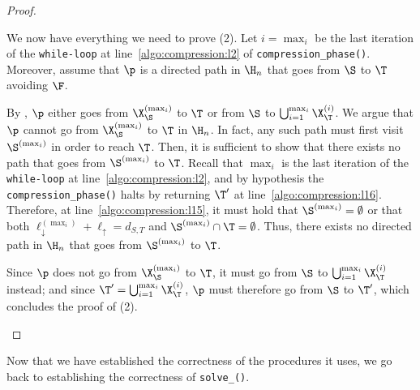 \begin{proof}
\begin{enumerate}
We now have everything we need to prove (2).
Let $i=\max_i$ be the last iteration of the \texttt{while-loop} at line~\ref{algo:compression:l2} of \texttt{compression\_phase()}.
Moreover, assume that $\p$ is a directed path in $\H_n$ that goes from $\S$ to $\T$ avoiding $\F$.

By , $\p$ either goes from
$\X^{(\max_i)}_\S$ to $\T$ or from $\S$ to $\bigcup_{i=1}^{\max_i} \X^{(i)}_\T$.
We argue that $\p$ cannot go from $\X^{(\max_i)}_\S$ to $\T$ in $\H_n$.
In fact, any such path must first visit $\S^{(\max_i)}$ in order to reach $\T$.
Then, it is sufficient to show that there exists no path that goes from $\S^{(\max_i)}$ to $\T$.
Recall that $\max_i$ is the last iteration of the \texttt{while-loop} at line~\ref{algo:compression:l2},
and by hypothesis the \texttt{compression\_phase()} halts by returning $\T'$ at line~\ref{algo:compression:l16}.
Therefore, at line~\ref{algo:compression:l15}, it must hold that $\S^{(\max_i)}=\emptyset$ or that both
$\ell_\downarrow^{(\max_i)}+\ell_\uparrow=d_{S,T}$ and $\S^{(\max_i)}\cap\T=\emptyset$.
Thus, there exists no directed path in $\H_n$ that goes from $\S^{(\max_i)}$ to $\T$.

Since $\p$ does not go from $\X^{(\max_i)}_\S$ to $\T$,
it must go from $\S$ to $\bigcup_{i=1}^{\max_i} \X^{(i)}_\T$ instead; and since
$\T'= \bigcup_{i=1}^{\max_i} \X^{(i)}_\T$,
$\p$ must therefore go from $\S$ to $\T'$, which concludes the  proof of (2).
\end{enumerate}
\end{proof}

Now that we have established the correctness of the procedures it uses, we go back to establishing the correctness of \texttt{solve\_\mainproblem()}.

